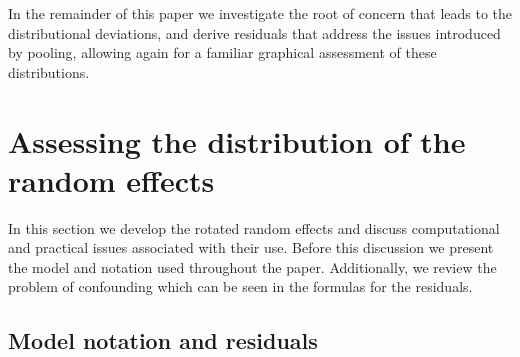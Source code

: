 \documentclass[12pt]{article} %
\newcommand{\hh}[1]{{\color{orange} #1}}
\begin{document}


In the remainder of this paper we investigate the root of concern that leads to the distributional deviations, and derive residuals that address the issues introduced by pooling, allowing again for a familiar graphical assessment of these distributions.

\section{Assessing the distribution of the random effects}\label{sec:methods}

In this section we develop the rotated random effects and discuss computational and practical issues associated with their use. Before this discussion we present the model and notation used throughout the paper. Additionally, we review the problem of confounding which can be seen in the formulas for the residuals.

\subsection{Model notation and residuals}\label{sec:resid}
\end{document}
